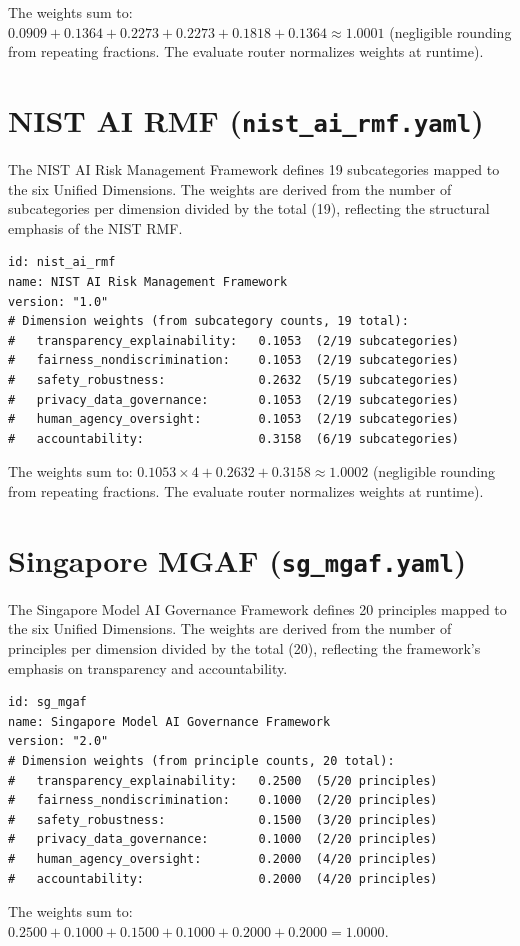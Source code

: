 \noindent The weights sum to: $0.0909 + 0.1364 + 0.2273 + 0.2273 + 0.1818 + 0.1364 \approx 1.0001$ (negligible rounding from repeating fractions. The evaluate router normalizes weights at runtime).

\section{NIST AI RMF (\texttt{nist\_ai\_rmf.yaml})}

The NIST AI Risk Management Framework defines 19 subcategories mapped to the six Unified Dimensions. The weights are derived from the number of subcategories per dimension divided by the total (19), reflecting the structural emphasis of the NIST RMF.

\begin{lstlisting}[language={}, caption={NIST AI RMF Section-Count Weights: derived from subcategory counts per dimension.}]
id: nist_ai_rmf
name: NIST AI Risk Management Framework
version: "1.0"
# Dimension weights (from subcategory counts, 19 total):
#   transparency_explainability:   0.1053  (2/19 subcategories)
#   fairness_nondiscrimination:    0.1053  (2/19 subcategories)
#   safety_robustness:             0.2632  (5/19 subcategories)
#   privacy_data_governance:       0.1053  (2/19 subcategories)
#   human_agency_oversight:        0.1053  (2/19 subcategories)
#   accountability:                0.3158  (6/19 subcategories)
\end{lstlisting}

\noindent The weights sum to: $0.1053 \times 4 + 0.2632 + 0.3158 \approx 1.0002$ (negligible rounding from repeating fractions. The evaluate router normalizes weights at runtime).

\section{Singapore MGAF (\texttt{sg\_mgaf.yaml})}

The Singapore Model AI Governance Framework defines 20 principles mapped to the six Unified Dimensions. The weights are derived from the number of principles per dimension divided by the total (20), reflecting the framework's emphasis on transparency and accountability.

\begin{lstlisting}[language={}, caption={Singapore MGAF Section-Count Weights: derived from principle counts per dimension.}]
id: sg_mgaf
name: Singapore Model AI Governance Framework
version: "2.0"
# Dimension weights (from principle counts, 20 total):
#   transparency_explainability:   0.2500  (5/20 principles)
#   fairness_nondiscrimination:    0.1000  (2/20 principles)
#   safety_robustness:             0.1500  (3/20 principles)
#   privacy_data_governance:       0.1000  (2/20 principles)
#   human_agency_oversight:        0.2000  (4/20 principles)
#   accountability:                0.2000  (4/20 principles)
\end{lstlisting}

\noindent The weights sum to: $0.2500 + 0.1000 + 0.1500 + 0.1000 + 0.2000 + 0.2000 = 1.0000$.
